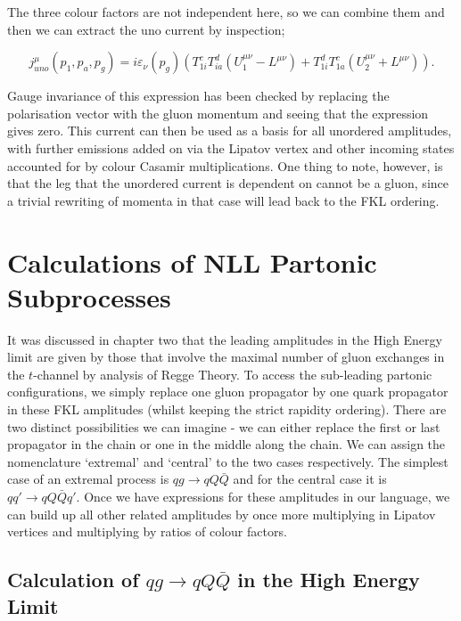 The three colour factors are not independent here, so we can combine them and then we can extract the uno current by inspection;

\begin{equation}
j^\mu_{uno}(p_1, p_a, p_g) = i \varepsilon_\nu(p_g) \left(T^c_{1i}T^d_{ia}\left(U_1^{\mu \nu} - L^{\mu \nu}\right) + T^d_{1i}T^c_{1a}\left(U_2^{\mu \nu} + L^{\mu \nu}\right) \right).
\end{equation}

Gauge invariance of this expression has been checked by replacing the polarisation vector with the gluon momentum and seeing that the expression gives zero. This current can then be used as a basis for all unordered amplitudes, with further emissions added on via the Lipatov vertex and other incoming states accounted for by colour Casamir multiplications. One thing to note, however, is that the leg that the unordered current is dependent on cannot be a gluon, since a trivial rewriting of momenta in that case will lead back to the FKL ordering. 

\section{Calculations of NLL Partonic Subprocesses}

It was discussed in chapter two that the leading amplitudes in the High Energy limit are given by those that involve the maximal number of gluon exchanges in the $t$-channel by analysis of Regge Theory. To access the sub-leading partonic configurations, we simply replace one gluon propagator by one quark propagator in these FKL amplitudes (whilst keeping the strict rapidity ordering). There are two distinct possibilities we can imagine - we can either replace the first or last propagator in the chain or one in the middle along the chain. We can assign the nomenclature `extremal' and `central' to the two cases respectively. The simplest case of an extremal process is $qg \to qQ\bar{Q}$ and for the central case it is $qq' \to qQ\bar{Q}q'$. Once we have expressions for these amplitudes in our language, we can build up all other related amplitudes by once more multiplying in Lipatov vertices and multiplying by ratios of colour factors. 

\subsection{Calculation of $qg \to qQ\bar{Q}$ in the High Energy Limit}

